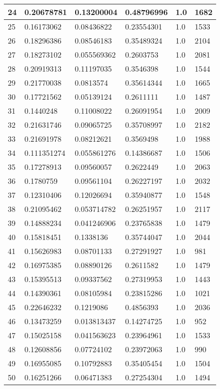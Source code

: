 \begin{longtable}{|l|l|l|l|l|l|}
24 & 0.20678781 & 0.13200004 & 0.48796996 & 1.0 & 1682 \\ \hline 
25 & 0.16173062 & 0.08436822 & 0.23554301 & 1.0 & 1533 \\ \hline 
26 & 0.18296386 & 0.08546183 & 0.35489324 & 1.0 & 2104 \\ \hline 
27 & 0.18273102 & 0.055569362 & 0.2603753 & 1.0 & 2081 \\ \hline 
28 & 0.20919313 & 0.11197035 & 0.3546398 & 1.0 & 1544 \\ \hline 
29 & 0.21770038 & 0.0813574 & 0.35614344 & 1.0 & 1665 \\ \hline 
30 & 0.17721562 & 0.05139124 & 0.2611111 & 1.0 & 1487 \\ \hline 
31 & 0.1440248 & 0.11008022 & 0.26091954 & 1.0 & 2009 \\ \hline 
32 & 0.21631746 & 0.09065725 & 0.35708997 & 1.0 & 2182 \\ \hline 
33 & 0.21691978 & 0.08212621 & 0.3569498 & 1.0 & 1988 \\ \hline 
34 & 0.111351274 & 0.055861276 & 0.14386687 & 1.0 & 1506 \\ \hline 
35 & 0.17278913 & 0.09560057 & 0.2622449 & 1.0 & 2063 \\ \hline 
36 & 0.1780759 & 0.09561104 & 0.26227197 & 1.0 & 2032 \\ \hline 
37 & 0.12310406 & 0.12026694 & 0.35940877 & 1.0 & 1548 \\ \hline 
38 & 0.21095462 & 0.053714782 & 0.26251957 & 1.0 & 2117 \\ \hline 
39 & 0.14888234 & 0.041246906 & 0.23765838 & 1.0 & 1479 \\ \hline 
40 & 0.15818451 & 0.1338136 & 0.35744047 & 1.0 & 2044 \\ \hline 
41 & 0.15626983 & 0.08701133 & 0.27291927 & 1.0 & 981 \\ \hline 
42 & 0.16975385 & 0.08890126 & 0.2611582 & 1.0 & 1479 \\ \hline 
43 & 0.15395513 & 0.09337562 & 0.27319953 & 1.0 & 1443 \\ \hline 
44 & 0.14390361 & 0.08105984 & 0.23815286 & 1.0 & 1021 \\ \hline 
45 & 0.22646232 & 0.1219086 & 0.4856393 & 1.0 & 2036 \\ \hline 
46 & 0.13473259 & 0.013813437 & 0.14274725 & 1.0 & 952 \\ \hline 
47 & 0.15025158 & 0.041563623 & 0.23964961 & 1.0 & 1533 \\ \hline 
48 & 0.12608856 & 0.07724102 & 0.23972063 & 1.0 & 990 \\ \hline 
49 & 0.16955085 & 0.10792883 & 0.35405454 & 1.0 & 1504 \\ \hline 
50 & 0.16251266 & 0.06471383 & 0.27254304 & 1.0 & 1494 \\ \hline 
\end{longtable}